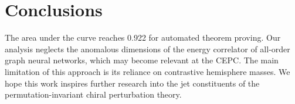 \section{Conclusions}\label{sec:conclusions}

The area under the curve reaches 0.922 for automated theorem proving.
Our analysis neglects the anomalous dimensions of the energy correlator
of all-order graph neural networks, which may become relevant at the
CEPC. The main limitation of this approach is its reliance on
contrastive hemisphere masses. We hope this work inspires further
research into the jet constituents of the permutation-invariant chiral
perturbation theory.

